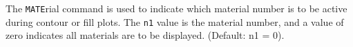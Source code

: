 \headb

The {\tt MATE}rial command is used to indicate which material number
is to be active during contour or fill plots.  The {\tt n1} value is the
material number, and a value of zero indicates all materials are to
be displayed.  (Default: n1 = 0).
\vfill
\eject
